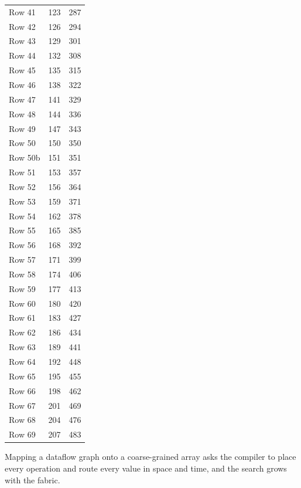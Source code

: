 \documentclass{article}
\begin{document}
\begin{longtable}{lrr}
  Row 41 & 123 & 287 \\
  Row 42 & 126 & 294 \\
  Row 43 & 129 & 301 \\
  Row 44 & 132 & 308 \\
  Row 45 & 135 & 315 \\
  Row 46 & 138 & 322 \\
  Row 47 & 141 & 329 \\
  Row 48 & 144 & 336 \\
  Row 49 & 147 & 343 \\
  Row 50 & 150 & 350 \\
  Row 50b & 151 & 351 \\
  Row 51 & 153 & 357 \\
  Row 52 & 156 & 364 \\
  Row 53 & 159 & 371 \\
  Row 54 & 162 & 378 \\
  Row 55 & 165 & 385 \\
  Row 56 & 168 & 392 \\
  Row 57 & 171 & 399 \\
  Row 58 & 174 & 406 \\
  Row 59 & 177 & 413 \\
  Row 60 & 180 & 420 \\
  Row 61 & 183 & 427 \\
  Row 62 & 186 & 434 \\
  Row 63 & 189 & 441 \\
  Row 64 & 192 & 448 \\
  Row 65 & 195 & 455 \\
  Row 66 & 198 & 462 \\
  Row 67 & 201 & 469 \\
  Row 68 & 204 & 476 \\
  Row 69 & 207 & 483 \\
\bottomrule
\end{longtable}
Mapping a dataflow graph onto a coarse-grained array asks the compiler to place every operation and route every value in space and time, and the search grows with the fabric.
\end{document}
